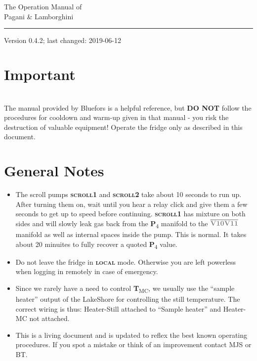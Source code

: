 \documentclass{article}[18pt,A4]
\newcommand{\thing}[1]{{\color{gray}\textsc{ \textbf{#1}}}}
\newcommand{\valve}[1]{{\color{gray}\textbf{V#1}}}
\newcommand{\pressure}[1]{{\color{pressurecolor}\textbf{P}\textsubscript{#1}}}
\newcommand{\temperature}[1]{{\color{temperaturecolor}\textbf{T}\textsubscript{#1}}}
\newcommand{\volume}[1]{\ensuremath{\overline{#1}}}
\begin{document}
{
\centering
{ \large \color{titlecolor} The Operation Manual of } \\
{ \Huge \color{titlecolor} Pagani \& Lamborghini } \\
{ \color{subsectioncolor}  \rule{\textwidth}{1px} }
}
{ \color{subsectioncolor} Version 0.4.2; last changed: 2019-06-12 } 



\section{Important}

\noindent{}
\\[1em]


The manual provided by Bluefors is a helpful reference,
but \textbf{DO NOT} follow the procedures for cooldown and warm-up given in that manual 
 - you risk the destruction of valuable equipment!
 Operate the fridge only as described in this document.  
 

\tableofcontents

\section{General Notes}
\begin{itemize}
\item The scroll pumps \thing{scroll1} and \thing{scroll2} take about 10 seconds to run up.
After turning them on, wait until you hear a relay click and give them a few seconds to get up to speed before continuing.
\thing{scroll1} has mixture on both sides and will slowly leak gas back from the \pressure{4}
manifold to the \volume{\valve{10} \valve{11}} manifold as well as internal spaces inside the pump.
This is normal. It takes about 20 minuites
to fully recover a quoted \pressure{4} value.
\item Do not leave the fridge in \thing{local} mode. Otherwise you are left powerless when
logging in remotely in case of emergency.
\item Since we rarely have a need to control \temperature{MC},
we usually use the ``sample heater'' output of the LakeShore for controlling
the still temperature. The correct wiring is thus: Heater-Still attached 
to ``Sample heater'' and Heater-MC not attached.
\item This is a living document and is updated to reflex the best known operating procedures.
If you spot a mistake or think of an improvement contact MJS or BT. 
\end{itemize}
\end{document}
